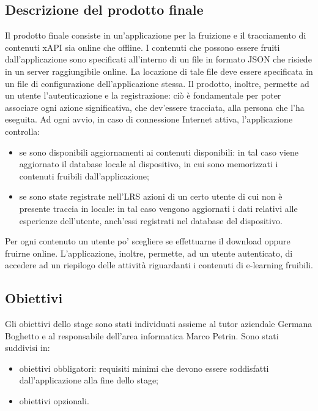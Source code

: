 \documentclass[../Tesi.tex]{subfiles}
\begin{document}
	\subsection{Descrizione del prodotto finale}
	Il prodotto finale consiste in un'applicazione per la fruizione e il tracciamento di contenuti xAPI sia online che offline. I contenuti che possono essere fruiti dall’applicazione sono specificati all'interno di un file in formato JSON che risiede in un server raggiungibile online. La locazione di tale file deve essere specificata in un file di configurazione dell'applicazione stessa. Il prodotto, inoltre, permette ad un utente l'autenticazione e la registrazione: ciò è fondamentale per poter associare ogni azione significativa, che dev'essere tracciata, alla persona che l'ha eseguita. Ad ogni avvio, in caso di connessione Internet attiva, l'applicazione controlla:
	\begin{itemize}
		\item se sono disponibili aggiornamenti ai contenuti disponibili: in tal caso viene aggiornato il database locale al dispositivo, in cui sono memorizzati i contenuti fruibili dall'applicazione;
		\item se sono state registrate nell'LRS azioni di un certo utente di cui non è presente traccia in locale: in tal caso vengono aggiornati i dati relativi alle esperienze dell'utente, anch'essi registrati nel database del dispositivo.
	\end{itemize} 
	Per ogni contenuto un utente po' scegliere se effettuarne il download oppure fruirne online.
	L'applicazione, inoltre, permette, ad un utente autenticato, di accedere ad un riepilogo delle attività riguardanti i contenuti di e-learning fruibili. 

	\subsection{Obiettivi}\label{subsec:obiettivi}
		Gli obiettivi dello stage sono stati individuati assieme al tutor aziendale Germana Boghetto e al responsabile dell'area informatica Marco Petrin. Sono stati suddivisi in:
		\begin{itemize}
			\item obiettivi obbligatori: requisiti minimi che devono essere soddisfatti dall'applicazione alla fine dello stage;
			\item obiettivi opzionali.
		\end{itemize}
\end{document}
